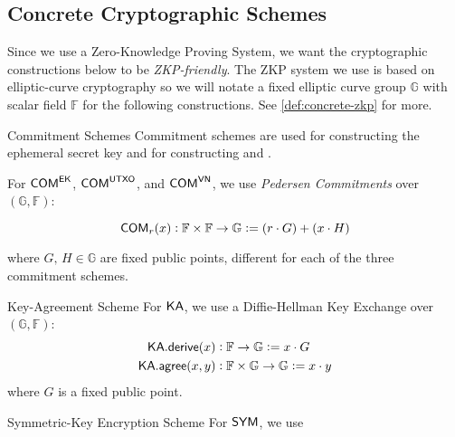 

\subsection{Concrete Cryptographic Schemes}

Since we use a Zero-Knowledge Proving System, we want the cryptographic constructions below to be \emph{ZKP-friendly}. The ZKP system we use is based on elliptic-curve cryptography so we will notate a fixed elliptic curve group $\mathbb{G}$ with scalar field $\mathbb{F}$ for the following constructions. See \autoref{def:concrete-zkp} for more.

\begin{definitiontoc}{Commitment Schemes}
    Commitment schemes are used for constructing the ephemeral secret key and for constructing  and .

    For ${\textsf{COM}}^{{\textsf{EK}}}$, ${\textsf{COM}}^{{\textsf{UTXO}}}$, and ${\textsf{COM}}^{{\textsf{VN}}}$, we use \emph{Pedersen Commitments} over $(\mathbb{G}, \mathbb{F})$:

    \[{\textsf{COM}}_r(x) : \mathbb{F} \times \mathbb{F} \to \mathbb{G} := (r \cdot G) + (x \cdot H)\]

    where $G,\,H \in \mathbb{G}$ are fixed public points, different for each of the three commitment schemes.
\end{definitiontoc}

\begin{definitiontoc}{Key-Agreement Scheme}
    For ${\textsf{KA}}$, we use a Diffie-Hellman Key Exchange over $(\mathbb{G}, \mathbb{F})$:
    \begin{align*}
        {\textsf{KA}}.{\textsf{derive}}(x)   &: \mathbb{F} \to \mathbb{G}                   := x \cdot G \\
        {\textsf{KA}}.{\textsf{agree}}(x, y) &: \mathbb{F} \times \mathbb{G} \to \mathbb{G} := x \cdot y
    \end{align*}
    where $G$ is a fixed public point.
\end{definitiontoc}

\begin{definitiontoc}{Symmetric-Key Encryption Scheme}
    For ${\textsf{SYM}}$, we use

\end{definitiontoc}

